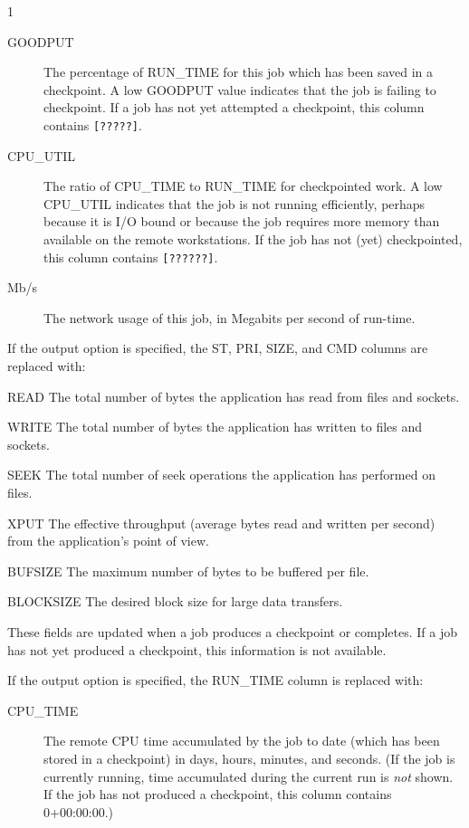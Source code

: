 \begin{ManPage}{\label{man-condor-q}}{1}
\begin{description}
\item[GOODPUT] The percentage of RUN\_TIME for this job which has been
saved in a checkpoint.  A low GOODPUT value indicates that the job is
failing to checkpoint.  If a job has not yet attempted a checkpoint,
this column contains \texttt{[?????]}.
\item[CPU\_UTIL] The ratio of CPU\_TIME to RUN\_TIME for checkpointed
work.  A low CPU\_UTIL indicates that the job is not running
efficiently, perhaps because it is I/O bound or because the job
requires more memory than available on the remote workstations.  If
the job has not (yet) checkpointed, this column contains \texttt{[??????]}.
\item[Mb/s] The network usage of this job, in Megabits per second of
run-time.
\end{description}

If the output option  is specified, the ST, PRI, SIZE, and CMD columns
are replaced with:

\begin{description}
\item{READ} The total number of bytes the application has read from files and sockets.
\item{WRITE} The total number of bytes the application has written to files and sockets.
\item{SEEK} The total number of seek operations the application has performed on files.
\item{XPUT} The effective throughput (average bytes read and written per second)
from the application's point of view.
\item{BUFSIZE} The maximum number of bytes to be buffered per file.
\item{BLOCKSIZE} The desired block size for large data transfers.
\end{description}

These fields are updated when a job produces a checkpoint or completes.
If a job
has not yet produced a checkpoint, this information is not available.

If the output option  is specified, the RUN\_TIME 
column is replaced with:

\begin{description}
\item[CPU\_TIME] The remote CPU time accumulated by the job to date
(which has been stored in a checkpoint) in days, hours, minutes, and
seconds.  (If the job is currently running, time accumulated during
the current run is \emph{not} shown.  If the job has not produced a checkpoint,
this column contains 0+00:00:00.)
\end{description}


\end{ManPage}
